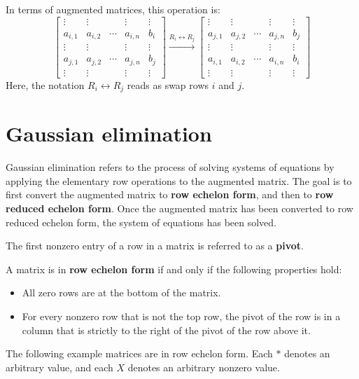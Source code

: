 \documentclass{article}
\begin{document}
In terms of augmented matrices, this operation is:
\[\left[\begin{array}{cccc|c}
\vdots & \vdots &  & \vdots & \vdots \\   
a_{i,1} & a_{i,2} & \cdots & a_{i,n} & b_i \\   
\vdots & \vdots &  & \vdots & \vdots \\ 
a_{j,1} & a_{j,2} & \cdots & a_{j,n} & b_j \\
\vdots & \vdots &  & \vdots & \vdots
\end{array}\right] 
\xrightarrow{R_i \leftrightarrow R_j} 
\left[\begin{array}{cccc|c}
\vdots & \vdots &  & \vdots & \vdots \\   
a_{j,1} & a_{j,2} & \cdots & a_{j,n} & b_j \\   
\vdots & \vdots &  & \vdots & \vdots \\ 
a_{i,1} & a_{i,2} & \cdots & a_{i,n} & b_i \\
\vdots & \vdots &  & \vdots & \vdots
\end{array}\right]\]
Here, the notation \(R_i \leftrightarrow R_j\) reads as swap rows \(i\) and \(j\).



\section*{Gaussian elimination}

Gaussian elimination refers to the process of solving systems of equations by applying the elementary row operations to the augmented matrix. The goal is to first convert the augmented matrix to {\bf row echelon form}, and then to {\bf row reduced echelon form}. Once the augmented matrix has been converted to row reduced echelon form, the system of equations has been solved.

The first nonzero entry of a row in a matrix is referred to as a {\bf pivot}.

A matrix is in {\bf row echelon form} if and only if the following properties hold:
\begin{itemize}
\item All zero rows are at the bottom of the matrix. 
\item For every nonzero row that is not the top row, the pivot of the row is in a column that is strictly to the right of the pivot of the row above it.
\end{itemize}

The following example matrices are in row echelon form. Each \(*\) denotes an arbitrary value, and each \(X\) denotes an arbitrary nonzero value.
\end{document}
